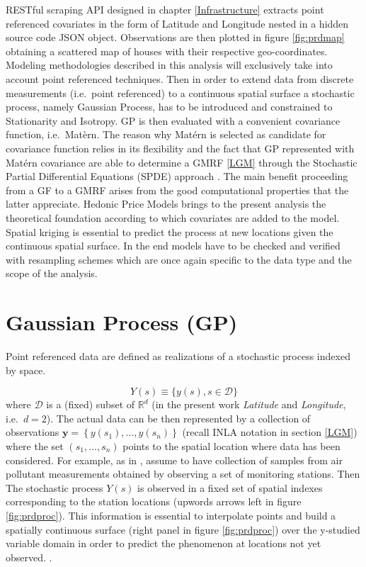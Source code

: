 \documentclass[
  12pt,
  a4paper,
  oneside]{book}
\theoremstyle{definition}
\theoremstyle{definition}
\theoremstyle{definition}
\theoremstyle{remark}
\begin{document}
RESTful scraping API designed in chapter \ref{Infrastructure} extracts point referenced covariates in the form of Latitude and Longitude nested in a hidden source code JSON object. Observations are then plotted in figure \ref{fig:prdmap} obtaining a scattered map of houses with their respective geo-coordinates. Modeling methodologies described in this analysis will exclusively take into account point referenced techniques.
Then in order to extend data from discrete measurements (i.e.~point referenced) to a continuous spatial surface a stochastic process, namely Gaussian Process, has to be introduced and constrained to Stationarity and Isotropy. GP is then evaluated with a convenient covariance function, i.e.~Matèrn. The reason why Matérn is selected as candidate for covariance function relies in its flexibility and the fact that GP represented with Matérn covariance are able to determine a GMRF \ref{LGM} through the Stochastic Partial Differential Equations (SPDE) approach \citep{Cameletti2012}. The main benefit proceeding from a GF to a GMRF arises from the good computational properties that the latter appreciate.
Hedonic Price Models brings to the present analysis the theoretical foundation according to which covariates are added to the model.
Spatial kriging is essential to predict the process at new locations given the continuous spatial surface.
In the end models have to be checked and verified with resampling schemes which are once again specific to the data type and the scope of the analysis.

\hypertarget{GP}{%
\section{Gaussian Process (GP)}\label{GP}}

Point referenced data are defined as realizations of a stochastic process indexed by space.

\[
Y(s) \equiv\{y(s), s \in \mathscr{D}\}
\]
where \(\mathscr{D}\) is a (fixed) subset of \(\mathbb{R}^{d}\) (in the present work \emph{Latitude} and \emph{Longitude}, i.e.~\(d=2\)). The actual data can be then represented by a collection of observations \(\boldsymbol{y}=\left\{y\left(s_{1}\right), \ldots, y\left(s_{n}\right)\right\}\) (recall INLA notation in section \ref{LGM}) where the set \(\left(s_{1}, \ldots, s_{n}\right)\) points to the spatial location where data has been considered. For example, as in \citet{Cameletti2012}, assume to have collection of samples from air pollutant measurements obtained by observing a set of monitoring stations. Then The stochastic process \(Y(s)\) is observed in a fixed set of spatial indexes corresponding to the station locations (upwords arrows left in figure \ref{fig:prdproc}). This information is essential to interpolate points and build a spatially continuous surface (right panel in figure \ref{fig:prdproc}) over the y-studied variable domain in order to predict the phenomenon at locations not yet observed. \citep{LecturePaci}.
\end{document}
